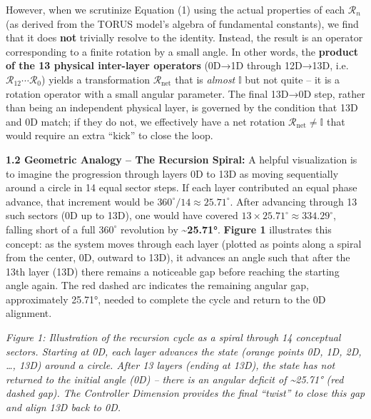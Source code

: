 \documentclass[]{article}
\begin{document}
However, when we scrutinize Equation (1) using the actual properties of
each $\mathcal{R}_n$ (as derived from the TORUS
model's algebra of fundamental constants), we find that it does
\textbf{not} trivially resolve to the identity. Instead, the result is
an operator corresponding to a finite rotation by a small angle. In
other words, the \textbf{product of the 13 physical inter-layer
operators} (0D→1D through 12D→13D, i.e.
$\mathcal{R}_{12}\cdots\mathcal{R}_0$)
yields a transformation
$\mathcal{R}_{\text{net}}$
that is \emph{almost} $\mathbb{I}$ but not quite --
it is a rotation operator with a small angular parameter. The final
13D→0D step, rather than being an independent physical layer, is
governed by the condition that 13D and 0D match; if they do not, we
effectively have a net rotation
$\mathcal{R}_{\text{net}} \neq \mathbb{I}$ that would
require an extra ``kick'' to close the loop.

\textbf{1.2 Geometric Analogy -- The Recursion Spiral:} A helpful
visualization is to imagine the progression through layers 0D to 13D as
moving sequentially around a circle in 14 equal sector steps. If each
layer contributed an equal phase advance, that increment would be
$360^\circ/14 \approx 25.71^\circ$. After advancing through 13 such sectors
(0D up to 13D), one would have covered $13 \times 25.71^\circ \approx
334.29^\circ$, falling short of a full
$360^\circ$ revolution by
\textbf{\textasciitilde{}25.71°}. \textbf{Figure 1} illustrates this
concept: as the system moves through each layer (plotted as points along
a spiral from the center, 0D, outward to 13D), it advances an angle such
that after the 13th layer (13D) there remains a noticeable gap before
reaching the starting angle again. The red dashed arc indicates the
remaining angular gap, approximately 25.71°, needed to complete the
cycle and return to the 0D alignment.

\emph{Figure 1: Illustration of the recursion cycle as a spiral through
14 conceptual sectors. Starting at 0D, each layer advances the state
(orange points 0D, 1D, 2D, \ldots{}, 13D) around a circle. After 13
layers (ending at 13D), the state has not returned to the initial angle
(0D) -- there is an angular deficit of \textasciitilde{}25.71° (red
dashed gap). The Controller Dimension provides the final ``twist'' to
close this gap and align 13D back to 0D.}
\end{document}
